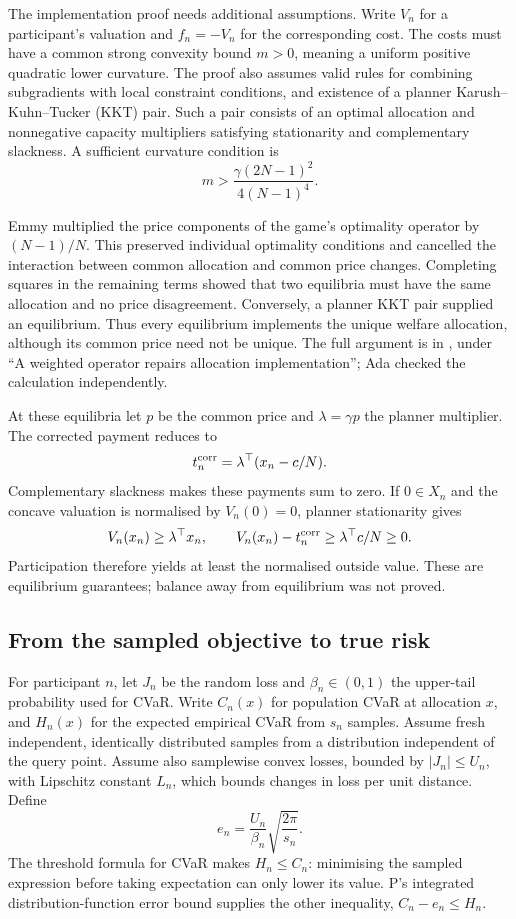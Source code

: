 \documentclass{article}
\begin{document}
The implementation proof needs additional assumptions.
Write \(V_n\) for a participant's valuation and \(f_n=-V_n\) for the corresponding cost.
The costs must have a common strong convexity bound \(m>0\), meaning a uniform positive quadratic lower curvature.
The proof also assumes valid rules for combining subgradients with local constraint conditions, and existence
of a planner Karush--Kuhn--Tucker (KKT) pair.
Such a pair consists of an optimal allocation and nonnegative capacity multipliers satisfying stationarity and complementary slackness.
A sufficient curvature condition is
\[
 m>\frac{\gamma(2N-1)^2}{4(N-1)^4}.
\]

Emmy multiplied the price components of the game's optimality operator by \((N-1)/N\).
This preserved individual optimality conditions and cancelled the interaction between common allocation and common price changes.
Completing squares in the remaining terms showed that two equilibria must have the same allocation and no price disagreement.
Conversely, a planner KKT pair supplied an equilibrium.
Thus every equilibrium implements the unique welfare allocation, although its common price need not be unique.
The full argument is in , under ``A weighted operator repairs allocation
implementation''; Ada checked the calculation independently.

At these equilibria let \(p\) be the common price and \(\lambda=\gamma p\) the planner multiplier.
The corrected payment reduces to
\[
 t_n^{\rm corr}=\lambda^\top(x_n-c/N).
\]
Complementary slackness makes these payments sum to zero.
If \(0\in X_n\) and the concave valuation is normalised by \(V_n(0)=0\), planner stationarity gives
\[
 V_n(x_n)\ge\lambda^\top x_n,
 \qquad V_n(x_n)-t_n^{\rm corr}\ge\lambda^\top c/N\ge0.
\]
Participation therefore yields at least the normalised outside value.
These are equilibrium guarantees; balance away from equilibrium was not proved.

\subsection{From the sampled objective to true risk}
For participant \(n\), let \(J_n\) be the random loss and \(\beta_n\in(0,1)\) the upper-tail probability used for CVaR.
Write \(C_n(x)\) for population CVaR at allocation \(x\), and \(H_n(x)\) for the expected empirical CVaR from \(s_n\) samples.
Assume fresh independent, identically distributed samples from a distribution independent of the query point.
Assume also samplewise convex losses, bounded by \(|J_n|\le U_n\), with Lipschitz constant \(L_n\), which
bounds changes in loss per unit distance.
Define
\[
 e_n=\frac{U_n}{\beta_n}\sqrt{\frac{2\pi}{s_n}}.
\]
The threshold formula for CVaR makes \(H_n\le C_n\): minimising the sampled expression before taking expectation can only lower its value.
P's integrated distribution-function error bound supplies the other inequality, \(C_n-e_n\le H_n\).
\end{document}
